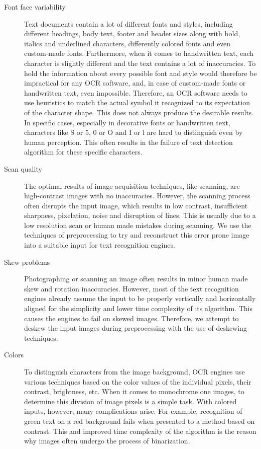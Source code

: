 \begin{description}

\item[Font face variability] Text documents contain a lot of different fonts and styles, including different headings, body text, footer and header sizes along with bold, italics and underlined characters, differently colored fonts and even custom-made fonts. Furthermore, when it comes to handwritten text, each character is slightly different and the text contains a lot of inaccuracies. To hold the information about every possible font and style would therefore be impractical for any OCR software, and, in case of custom-made fonts or handwritten text, even impossible. Therefore, an OCR software needs to use heuristics to match the actual symbol it recognized to its expectation of the character shape. This does not always produce the desirable results. In specific cases, especially in decorative fonts or handwritten text, characters like S or 5, 0 or O and I or l are hard to distinguish even by human perception. This often results in the failure of text detection algorithm for these specific characters.

\item[Scan quality] The optimal results of image acquisition techniques, like scanning, are high-contrast images with no inaccuracies. However, the scanning process often disrupts the input image, which results in low contrast, insufficient sharpness, pixelation, noise and disruption of lines. This is usually due to a low resolution scan or human made mistakes during scanning. We use the techniques of preprocessing to try and reconstruct this error prone image into a suitable input for text recognition engines.

\item[Skew problems] Photographing or scanning an image often results in minor human made skew and rotation inaccuracies. However, most of the text recognition engines already assume the input to be properly vertically and horizontally aligned for the simplicity and lower time complexity of its algorithm. This causes the engines to fail on skewed images. Therefore, we attempt to deskew the input images during preprocessing with the use of deskewing techniques.

\item[Colors] To distinguish characters from the image background, OCR engines use various techniques based on the color values of the individual pixels, their contrast, brightness, etc. When it comes to monochrome one images, to determine this division of image pixels is a simple task. With colored inputs, however, many complications arise. For example, recognition of green text on a red background fails when presented to a method based on contrast. This and improved time complexity of the algorithm is the reason why images often undergo the process of binarization. 

\end{description}

